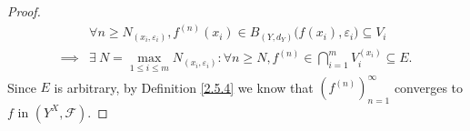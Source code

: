\begin{proof}
\begin{align*}
                 & \forall n \geq N_{(x_i, \varepsilon_i)}, f^{(n)}(x_i) \in B_{(Y, d_Y)}\big(f(x_i), \varepsilon_i\big) \subseteq V_i                                                               \\
        \implies & \exists\ N = \max_{1 \leq i \leq m} N_{(x_i, \varepsilon_i)} : \forall n \geq N, f^{(n)} \in \bigcap_{i = 1}^m V_i^{(x_i)} \subseteq E.
    \end{align*}
    Since \(E\) is arbitrary, by Definition \ref{2.5.4} we know that \((f^{(n)})_{n = 1}^\infty\) converges to \(f\) in \((Y^X, \mathcal{F})\).
\end{proof}